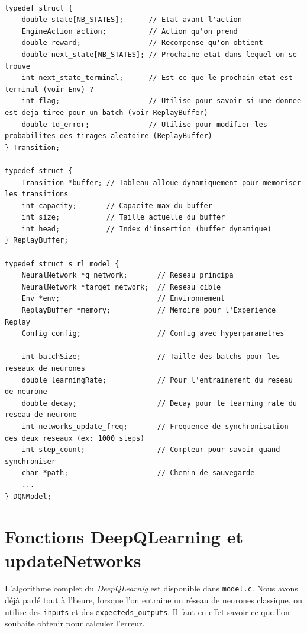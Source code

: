 \documentclass{article}
\begin{document}
\begin{lstlisting}[style=CStyle]

typedef struct {
    double state[NB_STATES];      // Etat avant l'action
    EngineAction action;          // Action qu'on prend
    double reward;                // Recompense qu'on obtient
    double next_state[NB_STATES]; // Prochaine etat dans lequel on se trouve
    int next_state_terminal;      // Est-ce que le prochain etat est terminal (voir Env) ?
    int flag;                     // Utilise pour savoir si une donnee est deja tiree pour un batch (voir ReplayBuffer)
    double td_error;              // Utilise pour modifier les probabilites des tirages aleatoire (ReplayBuffer)
} Transition;

typedef struct {
    Transition *buffer; // Tableau alloue dynamiquement pour memoriser les transitions
    int capacity;       // Capacite max du buffer
    int size;           // Taille actuelle du buffer
    int head;           // Index d'insertion (buffer dynamique)
} ReplayBuffer;

typedef struct s_rl_model {
    NeuralNetwork *q_network;       // Reseau principa
    NeuralNetwork *target_network;  // Reseau cible
    Env *env;                       // Environnement
    ReplayBuffer *memory;           // Memoire pour l'Experience Replay
    Config config;                  // Config avec hyperparametres

    int batchSize;                  // Taille des batchs pour les reseaux de neurones
    double learningRate;            // Pour l'entrainement du reseau de neurone
    double decay;                   // Decay pour le learning rate du reseau de neurone
    int networks_update_freq;       // Frequence de synchronisation des deux reseaux (ex: 1000 steps)
    int step_count;                 // Compteur pour savoir quand synchroniser
    char *path;                     // Chemin de sauvegarde
    ...
} DQNModel;
\end{lstlisting}

\section{Fonctions DeepQLearning et updateNetworks}

\vspace{0.5cm} 

L'algorithme complet du \textit{DeepQLearnig} est disponible dans \texttt{model.c}.
Nous avons déjà parlé tout à l'heure, lorsque l'on entraine un réseau de neurones classique,
on utilise des \texttt{inputs} et des \texttt{expecteds\_outputs}. Il faut en effet savoir ce que l'on souhaite obtenir
pour calculer l'erreur.
\end{document}
